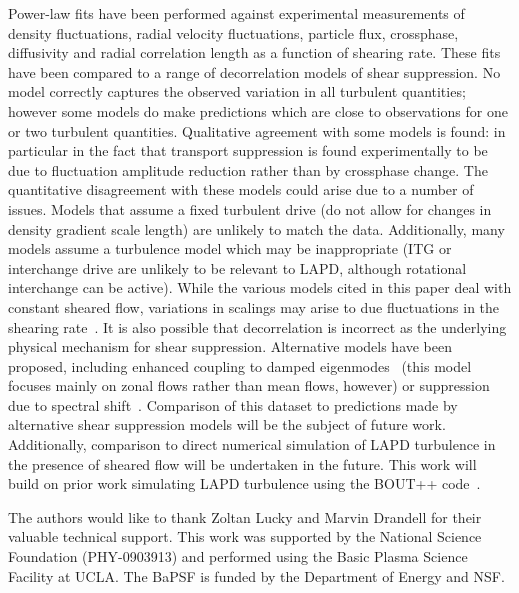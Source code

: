 \documentclass[aip,pop,amsmath,amssymb,preprint,superscriptaddress]{revtex4-1} %
\begin{document}
Power-law fits have been performed against experimental measurements
of density fluctuations, radial velocity fluctuations, particle flux,
crossphase, diffusivity and radial correlation length as a function of
shearing rate.  These fits have been compared to a range of
decorrelation models of shear suppression. No model correctly captures
the observed variation in all turbulent quantities; however some
models do make predictions which are close to observations for one or
two turbulent quantities.  Qualitative agreement with some models is
found: in particular in the fact that transport suppression is found
experimentally to be due to fluctuation amplitude reduction rather
than by crossphase change.  The quantitative disagreement with
these models could arise due to a number of issues.  Models that
assume a fixed turbulent drive (do not allow for changes in density
gradient scale length) are unlikely to match the data.  Additionally,
many models assume a turbulence model which may be inappropriate (ITG
or interchange drive are unlikely to be relevant to LAPD, although
rotational interchange can be active). While the various models cited in this paper deal with constant sheared flow, variations in scalings may arise to due fluctuations in the shearing rate~\cite{kim04,leconte06,newton07}.  It is also possible
that decorrelation is incorrect as the underlying physical mechanism
for shear suppression.  Alternative models have been proposed,
including enhanced coupling to damped eigenmodes~\cite{terry06} (this model focuses
mainly on zonal flows rather than mean flows, however) or suppression
due to spectral shift~\cite{staebler12}.  Comparison of this dataset to
predictions made by alternative shear suppression models will be the
subject of future work.  Additionally, comparison to direct numerical
simulation of LAPD turbulence in the presence of sheared flow will
be undertaken in the future.  This work will build on prior work simulating LAPD turbulence
using the BOUT++ code~\cite{friedman12,umansky11,popovich10BOUT}.

The authors would like to thank Zoltan Lucky and Marvin Drandell for their valuable technical support.  This work
was supported by the National Science Foundation (PHY-0903913) and performed using the Basic Plasma Science Facility at UCLA. The BaPSF is funded by the
Department of Energy and NSF.
\end{document}
